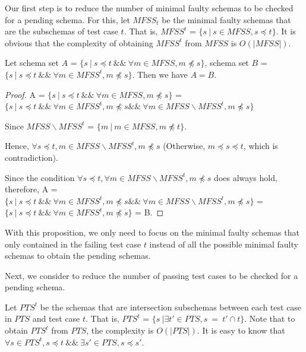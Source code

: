 Our first step is to reduce the number of minimal faulty schemas to be checked for a pending schema.  For this, let $MFSS_{t}$ be the minimal faulty schemas that are the subschemas of test case $t$. That is, $MFSS^{t}$ = $\{ s\ | \ s \in MFSS, s \preceq t \}$.  It is obvious that the complexity of obtaining $MFSS^{t}$ from $MFSS$ is $O(|MFSS|)$.



\begin{proposition}\label{pro:mfssintequal}
Let schema set $A$ = $\{ s\ |\ s \preceq t\ \&\&\ \forall m \in MFSS,  m \npreceq s \}$,  schema set $B$ = $\{ s\ |\ s \preceq t\ \&\&\ \forall m \in MFSS^{t},  m \npreceq s \}$. Then we have $A = B$.
\end{proposition}

\begin{proof}

A = $\{ s\ |\  s \preceq t\ \&\&\ \forall m \in MFSS,  m \npreceq s \}$
 =
$\{ s\ |\  s \preceq t\ \&\&\ \forall m \in MFSS^{t},  m \npreceq s \&\&\   \forall m \in MFSS \backslash MFSS^{t},  m \npreceq s  \}$

Since $MFSS \backslash MFSS^{t}$ = $\{ m \ | \ m \in MFSS, m \npreceq t \}$.

Hence, $\forall s \preceq t, m \in MFSS \backslash MFSS^{t},  m \npreceq s$ (Otherwise, $m \preceq s \preceq t$, which is contradiction).

Since the condition $\forall s \preceq t, \forall m \in MFSS \backslash MFSS^{t},  m \npreceq s $ does always hold, therefore, A =
$\{ s\ |\  s \preceq t\ \&\&\ \forall m \in MFSS^{t},  m \npreceq s \&\&\   \forall m \in MFSS \backslash MFSS^{t},  m \npreceq s  \}$  =
$\{ s\ |\  s \preceq t\ \&\&\ \forall m \in MFSS^{t},  m \npreceq s \}$ = B.
\end{proof}

With this proposition, we only need to focus on the minimal faulty schemas that only contained in the failing test case $t$ instead of all the possible minimal faulty schemas to obtain the pending schemas. %

Next, we consider to reduce the number of passing test cases to be checked for a pending schema.

Let $PTS^{t}$ be the schemas that are intersection subschemas between each test case in $PTS$ and test case $t$. That is, $PTS^{t}$ = $\{ s\ | \exists t' \in  PTS, s\ =\ t' \cap t \}$. Note that to obtain $PTS^{t}$ from $PTS$, the complexity is $O(|PTS|)$.  It is easy to know that $\forall s \in PTS^{t}, s \preceq t \ \&\& \ \exists s' \in PTS, s \preceq s'$.


